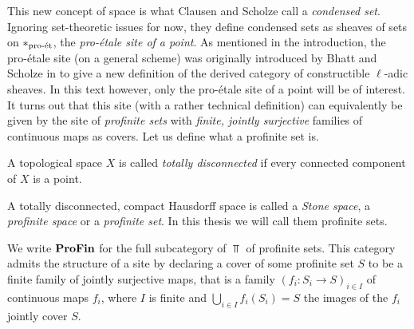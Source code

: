 This new concept of space is what Clausen and Scholze call a \emph{condensed set}. Ignoring set-theoretic issues for now, they define condensed sets as sheaves of sets on $\proetalesite{\ast}$, the \emph{pro-étale site of a point}. As mentioned in the introduction, the pro-étale site (on a general scheme) was originally introduced by Bhatt and Scholze in \cite{bhatt2014proetaletopologyschemes} to give a new definition of the derived category of constructible $\ell$-adic sheaves. In this text however, only the pro-étale site of a point will be of interest. It turns out that this site (with a rather technical definition) can equivalently be given by the site of \emph{profinite sets} with \emph{finite, jointly surjective} families of continuous maps as covers. Let us define what a profinite set is.
\begin{definition}
	A topological space $X$ is called \emph{totally disconnected} if every connected component of $X$ is a point.
	
	A totally disconnected, compact Hausdorff space is called a \emph{Stone space}, a \emph{profinite space} or a \emph{profinite set}. In this thesis we will call them profinite sets.
	
	We write $\proFiniteSets$ for the full subcategory of $\Top$ of profinite sets. This category admits the structure of a site by declaring a cover of some profinite set $S$ to be a finite family of jointly surjective maps, that is a family $(f_i\colon S_i\to S)_{i\in I}$ of continuous maps $f_i$, where $I$ is finite and $\bigcup_{i\in I} f_i(S_i) = S$ \ie the images of the $f_i$ jointly cover $S$.
\end{definition}

